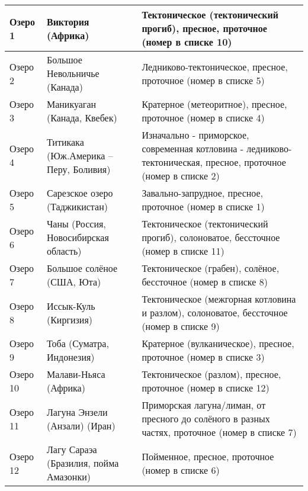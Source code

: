 \begin{longtable}{|l|p{5.3cm}|p{7.3cm}}
    \hline
    \rowcolor{blue} Озеро 1 & Виктория (Африка) & Тектоническое (тектонический прогиб), пресное, проточное (номер в списке 10) \\
    \hline
    \rowcolor{blue} Озеро 2 & Большое Невольничье (Канада) & Ледниково-тектоническое, пресное, проточное (номер в списке 5) \\
    \hline
    \rowcolor{green} Озеро 3 & Маникуаган (Канада, Квебек) & Кратерное (метеоритное), пресное, проточное (номер в списке 4) \\
    \hline
    \rowcolor{blue} Озеро 4 & Титикака (Юж.Америка – Перу, Боливия) & Изначально - приморское, современная котловина - ледниково-тектоническая, пресное, проточное (номер в списке 2) \\
    \hline
    \rowcolor{green} Озеро 5 & Сарезское озеро (Таджикистан) & Завально-запрудное, пресное, проточное (номер в списке 1) \\
    \hline
    \rowcolor{cyan} Озеро 6 & Чаны (Россия, Новосибирская область) & Тектоническое (тектонический прогиб), солоноватое, бессточное (номер в списке 11) \\
    \hline
    \rowcolor{green} Озеро 7 & Большое солёное (США, Юта) & Тектоническое (грабен), солёное, бессточное (номер в списке 8) \\
    \hline
    \rowcolor{yellow} Озеро 8 & Иссык-Куль (Киргизия) & Тектоническое (межгорная котловина и разлом), солоноватое, бессточное (номер в списке 9) \\
    \hline
    \rowcolor{yellow} Озеро 9 & Тоба (Суматра, Индонезия) & Кратерное (вулканическое), пресное, проточное (номер в списке 3) \\
    \hline
    \rowcolor{green} Озеро 10 & Малави-Ньяса (Африка) & Тектоническое (разлом), пресное, проточное (номер в списке 12) \\
    \hline
    \rowcolor{green} Озеро 11 & Лагуна Энзели (Анзали) (Иран)	& Приморская лагуна/лиман, от пресного до солёного в разных частях, проточное (номер в списке 7) \\
    \hline
    \rowcolor{green} Озеро 12 & Лагу Сараэа (Бразилия, пойма Амазонки) & Пойменное, пресное, проточное (номер в списке 6) \\
    \hline
\end{longtable}